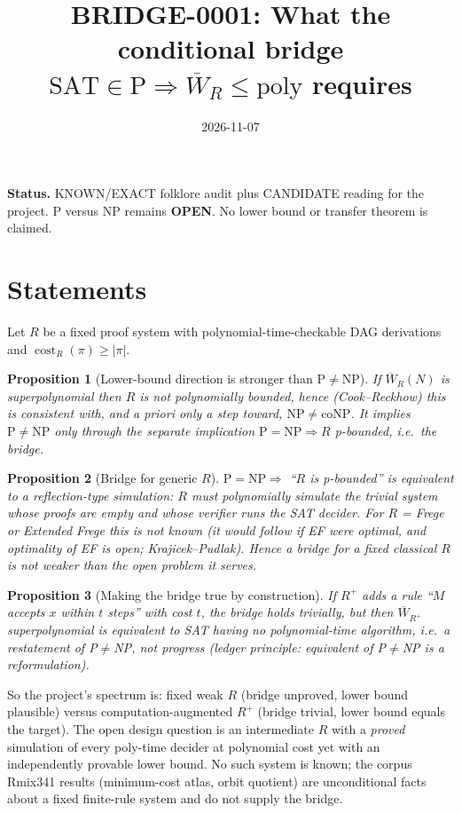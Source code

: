 \documentclass{article}
\title{BRIDGE-0001: What the conditional bridge $\mathrm{SAT}\in\mathrm P\Rightarrow\overline W_R\le\mathrm{poly}$ requires}
\date{2026-11-07}
\newtheorem{proposition}{Proposition}
\begin{document}
\maketitle
\noindent\textbf{Status.} KNOWN/EXACT folklore audit plus CANDIDATE reading for the project. P versus NP remains \textbf{OPEN}. No lower bound or transfer theorem is claimed.

\section*{Statements}
Let $R$ be a fixed proof system with polynomial-time-checkable DAG derivations and $\operatorname{cost}_R(\pi)\ge|\pi|$.
\begin{proposition}[Lower-bound direction is stronger than P$\neq$NP]
If $\overline W_R(N)$ is superpolynomial then $R$ is not polynomially bounded, hence (Cook--Reckhow) this is consistent with, and a priori only a step toward, $\mathrm{NP}\neq\mathrm{coNP}$. It implies $\mathrm P\neq\mathrm{NP}$ only through the separate implication $\mathrm P=\mathrm{NP}\Rightarrow R$ p-bounded, i.e.\ the bridge.
\end{proposition}
\begin{proposition}[Bridge for generic $R$]
$\mathrm P=\mathrm{NP}\Rightarrow$ ``$R$ is p-bounded'' is equivalent to a reflection-type simulation: $R$ must polynomially simulate the trivial system whose proofs are empty and whose verifier runs the SAT decider. For $R$ = Frege or Extended Frege this is not known (it would follow if EF were optimal, and optimality of EF is open; Krajicek--Pudlak). Hence a bridge for a fixed classical $R$ is not weaker than the open problem it serves.
\end{proposition}
\begin{proposition}[Making the bridge true by construction]
If $R^{+}$ adds a rule ``$M$ accepts $x$ within $t$ steps'' with cost $t$, the bridge holds trivially, but then $\overline W_{R^+}$ superpolynomial is equivalent to SAT having no polynomial-time algorithm, i.e.\ a restatement of P$\neq$NP, not progress (ledger principle: equivalent of P$\neq$NP is a reformulation).
\end{proposition}
\noindent So the project's spectrum is: fixed weak $R$ (bridge unproved, lower bound plausible) versus computation-augmented $R^+$ (bridge trivial, lower bound equals the target). The open design question is an intermediate $R$ with a \emph{proved} simulation of every poly-time decider at polynomial cost yet with an independently provable lower bound. No such system is known; the corpus Rmix341 results (minimum-cost atlas, orbit quotient) are unconditional facts about a fixed finite-rule system and do not supply the bridge.
\end{document}

